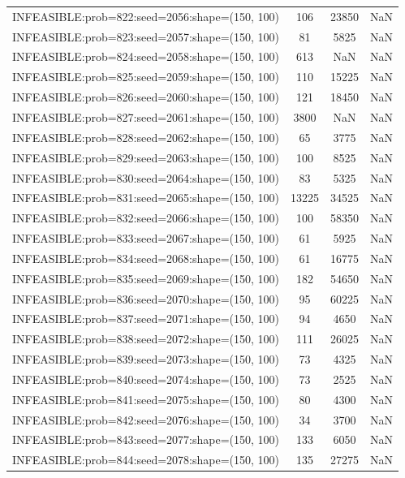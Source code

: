 \begin{longtable}{lccc}
INFEASIBLE:prob=822:seed=2056:shape=(150, 100) &   106 & 23850 &    NaN \\
INFEASIBLE:prob=823:seed=2057:shape=(150, 100) &    81 &  5825 &    NaN \\
INFEASIBLE:prob=824:seed=2058:shape=(150, 100) &   613 &   NaN &    NaN \\
INFEASIBLE:prob=825:seed=2059:shape=(150, 100) &   110 & 15225 &    NaN \\
INFEASIBLE:prob=826:seed=2060:shape=(150, 100) &   121 & 18450 &    NaN \\
INFEASIBLE:prob=827:seed=2061:shape=(150, 100) &  3800 &   NaN &    NaN \\
INFEASIBLE:prob=828:seed=2062:shape=(150, 100) &    65 &  3775 &    NaN \\
INFEASIBLE:prob=829:seed=2063:shape=(150, 100) &   100 &  8525 &    NaN \\
INFEASIBLE:prob=830:seed=2064:shape=(150, 100) &    83 &  5325 &    NaN \\
INFEASIBLE:prob=831:seed=2065:shape=(150, 100) & 13225 & 34525 &    NaN \\
INFEASIBLE:prob=832:seed=2066:shape=(150, 100) &   100 & 58350 &    NaN \\
INFEASIBLE:prob=833:seed=2067:shape=(150, 100) &    61 &  5925 &    NaN \\
INFEASIBLE:prob=834:seed=2068:shape=(150, 100) &    61 & 16775 &    NaN \\
INFEASIBLE:prob=835:seed=2069:shape=(150, 100) &   182 & 54650 &    NaN \\
INFEASIBLE:prob=836:seed=2070:shape=(150, 100) &    95 & 60225 &    NaN \\
INFEASIBLE:prob=837:seed=2071:shape=(150, 100) &    94 &  4650 &    NaN \\
INFEASIBLE:prob=838:seed=2072:shape=(150, 100) &   111 & 26025 &    NaN \\
INFEASIBLE:prob=839:seed=2073:shape=(150, 100) &    73 &  4325 &    NaN \\
INFEASIBLE:prob=840:seed=2074:shape=(150, 100) &    73 &  2525 &    NaN \\
INFEASIBLE:prob=841:seed=2075:shape=(150, 100) &    80 &  4300 &    NaN \\
INFEASIBLE:prob=842:seed=2076:shape=(150, 100) &    34 &  3700 &    NaN \\
INFEASIBLE:prob=843:seed=2077:shape=(150, 100) &   133 &  6050 &    NaN \\
INFEASIBLE:prob=844:seed=2078:shape=(150, 100) &   135 & 27275 &    NaN \\

\end{longtable}
